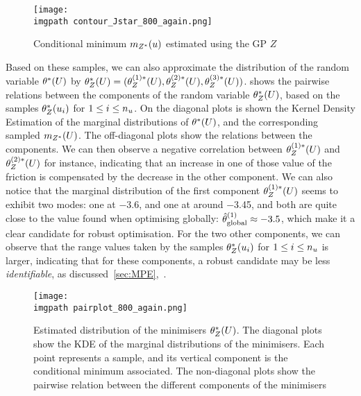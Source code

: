 \documentclass[../../Main_ManuscritThese.tex]{subfiles}
\newcommand\imgpath{/home/victor/acadwriting/Manuscrit/Text/Chapter5/img/}
\begin{document}
\begin{figure}[ht]
 \centering
 \texttt{[image: \\imgpath contour\_Jstar\_800\_again.png]}
 \caption{\label{fig:contour_Jstar} Conditional minimum $m_{Z^*}(u)$
   estimated using the GP $Z$}
\end{figure}
Based on these samples, we can also approximate the distribution of
the random variable $\kk^*(\UU)$ by
$\theta_Z^*(U) = (\theta^{(1) *}_Z(U), \theta^{(2) *}_Z(U), \theta^{(3)
  *}_Z(U))$.   shows the pairwise relations
between the components of the random variable $\theta^*_Z(U)$, based on
the samples $\theta^*_Z(u_i)$ for $1\leq i \leq n_{u}$. On the
diagonal plots is shown the Kernel Density Estimation of the marginal
distributions of $\kk^*(\UU)$, and the corresponding sampled
$m_{Z^*}(U)$. The off-diagonal plots show the relations between the
components. We can then observe a negative correlation between
$\theta^{(1) *}_Z(U)$ and $\theta^{(2) *}_Z(U)$ for instance, indicating that
an increase in one of those value of the friction is compensated by
the decrease in the other component.  We can also notice that the
marginal distribution of the first component $\theta_Z^{(1)*}(U)$ seems
to exhibit two modes: one at \num{-3.6}, and one at around
\num{-3.45}, and both are quite close to the value found when
optimising globally:
$\hat{\theta}^{(1)}_{\mathrm{global}}\approx \num{-3.5}$, which make it a
clear candidate for robust optimisation. For the two other components,
we can observe that the range values taken by the samples
$\theta^*_Z(u_i)$ for $1 \leq i \leq n_{u}$ is larger, indicating
that for these components, a robust candidate may be less
\emph{identifiable}, as discussed~\cref{sec:MPE},~.

\begin{figure}[ht]
  \centering
  \texttt{[image: \\imgpath pairplot\_800\_again.png]}
  \caption[Distribution of the minimisers
  $\kk^*(\UU)$]{\label{fig:pairplot} Estimated distribution of the
    minimisers $\theta^*_Z(U)$. The diagonal plots show the KDE of the
    marginal distributions of the minimisers. Each point represents a
    sample, and its vertical component is the conditional minimum
    associated. The non-diagonal plots show the pairwise relation
    between the different components of the minimisers }
\end{figure}

\clearpage
\end{document}
